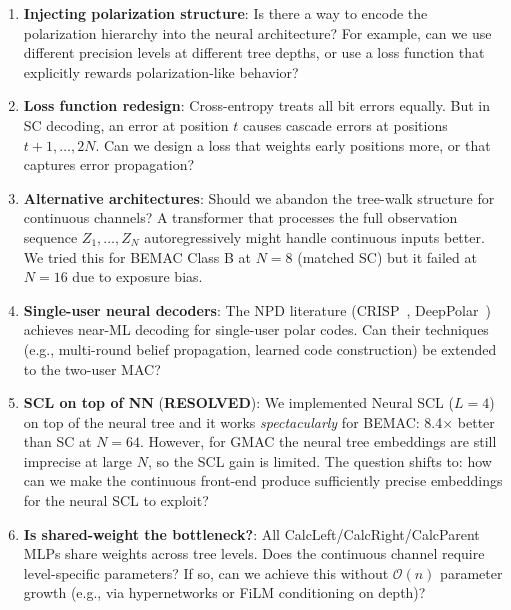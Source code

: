 \documentclass[10pt]{article}
\begin{document}
\begin{enumerate}
    \item \textbf{Injecting polarization structure}: Is there a way to encode the polarization hierarchy into the neural architecture? For example, can we use different precision levels at different tree depths, or use a loss function that explicitly rewards polarization-like behavior?

    \item \textbf{Loss function redesign}: Cross-entropy treats all bit errors equally. But in SC decoding, an error at position $t$ causes cascade errors at positions $t+1, \ldots, 2N$. Can we design a loss that weights early positions more, or that captures error propagation?

    \item \textbf{Alternative architectures}: Should we abandon the tree-walk structure for continuous channels? A transformer that processes the full observation sequence $Z_1, \ldots, Z_N$ autoregressively might handle continuous inputs better. We tried this for BEMAC Class B at $N = 8$ (matched SC) but it failed at $N = 16$ due to exposure bias.

    \item \textbf{Single-user neural decoders}: The NPD literature (CRISP~\cite{crisp2023}, DeepPolar~\cite{deeppolar2024}) achieves near-ML decoding for single-user polar codes. Can their techniques (e.g., multi-round belief propagation, learned code construction) be extended to the two-user MAC?

    \item \textbf{SCL on top of NN} (\textcolor{green!60!black}{\textbf{RESOLVED}}): We implemented Neural SCL ($L = 4$) on top of the neural tree and it works \emph{spectacularly} for BEMAC: 8.4$\times$ better than SC at $N = 64$. However, for GMAC the neural tree embeddings are still imprecise at large $N$, so the SCL gain is limited. The question shifts to: how can we make the continuous front-end produce sufficiently precise embeddings for the neural SCL to exploit?

    \item \textbf{Is shared-weight the bottleneck?}: All CalcLeft/CalcRight/CalcParent MLPs share weights across tree levels. Does the continuous channel require level-specific parameters? If so, can we achieve this without $\mathcal{O}(n)$ parameter growth (e.g., via hypernetworks or FiLM conditioning on depth)?
\end{enumerate}
\end{document}
